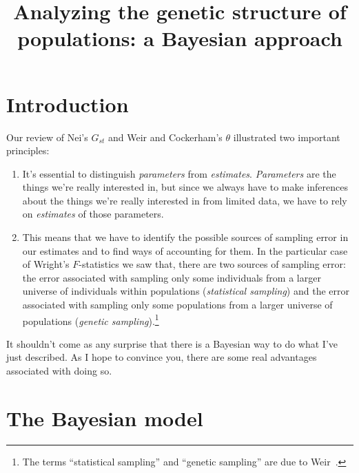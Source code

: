 \documentclass[12pt]{article}
\title{Analyzing the genetic structure of populations: a Bayesian approach}
\begin{document}
\maketitle

\thispagestyle{first}

\section*{Introduction}

Our review of Nei's $G_{st}$ and Weir and Cockerham's $\theta$
illustrated two important principles:

\begin{enumerate}

\item It's essential to distinguish {\it parameters} from {\it
  estimates}. {\it Parameters} are the things we're really interested
  in, but since we always have to make inferences about the things
  we're really interested in from limited data, we have to rely on
  {\it estimates} of those parameters.

\item This means that we have to identify the possible sources of
  sampling error in our estimates and to find ways of accounting for
  them. In the particular case of Wright's $F$-statistics we saw that,
  there are two sources of sampling error: the error associated with
  sampling only some individuals from a larger universe of individuals
  within populations ({\it statistical sampling\/}) and the error
  associated with sampling only some populations from a larger
  universe of populations ({\it genetic sampling\/}).\footnote{The
  terms ``statistical sampling'' and ``genetic sampling'' are due to
  Weir~\cite{Weir-1996}.}

\end{enumerate}

\noindent It shouldn't come as any surprise that there is a Bayesian
way to do what I've just described. As I hope to convince you, there
are some real advantages associated with doing so.

\section*{The Bayesian model}
\end{document}

